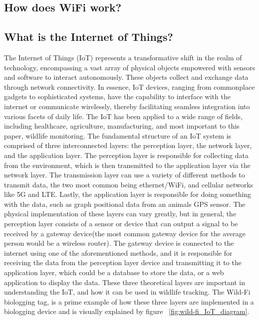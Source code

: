\documentclass[sigplan,screen,nonacm]{acmart}
\begin{document}
\subsection{How does WiFi work?}
\label{subsec:How does WiFi work?}


\subsection{What is the Internet of Things?}
\label{subsec:What is the Internet of Things}

The Internet of Things (IoT) represents a transformative shift in the
realm of technology, encompassing a vast array of physical objects empowered
with sensors and software to interact autonomously. These objects collect and
exchange data through network connectivity. In essence, IoT devices, ranging
from commonplace gadgets to sophisticated systems, have the capability to
interface with the internet or communicate wirelessly, thereby facilitating
seamless integration into various facets of daily life. The IoT has been
applied to a wide range of fields, including healthcare, agriculture,
manufacturing, and most important to this paper, wildlife monitoring.
The fundamental structure of an IoT system is comprised of three
interconnected layers: the perception layer, the network layer, and the
application layer\cite{kumar2019internet}. The perception layer is responsible for collecting data
from the environment, which is then transmitted to the application layer via the network layer.
The transmission layer can use a variety of different methods to transmit data, the two most common being
ethernet/WiFi, and cellular networks like 5G and LTE\cite{greengard2021internet}. Lastly, the application
layer is responsible for doing something with the data, such as graph positional data from an
animals GPS sensor. The physical implementation of these layers
can vary greatly, but in general, the perception layer consists of a sensor or device that can
output a signal to be received by a gateway device(the most common gateway device for
the average person would be a wireless router). The gateway device is connected to
the internet using one of the aforementioned methods, and it is responsible for
receiving the data from the perception layer device and transmitting it to the application
layer, which could be a database to store the data, or a web application to display
the data\cite{kumar2019internet}. These three theoretical layers are important in understanding the IoT,
and how it can be used in wildlife tracking. The Wild-Fi biologging tag, is a prime example 
of how these three layers are implemented in a biologging device and is visually explained 
by figure ~\ref{fig:wild-fi_IoT_diagram}.
\end{document}
